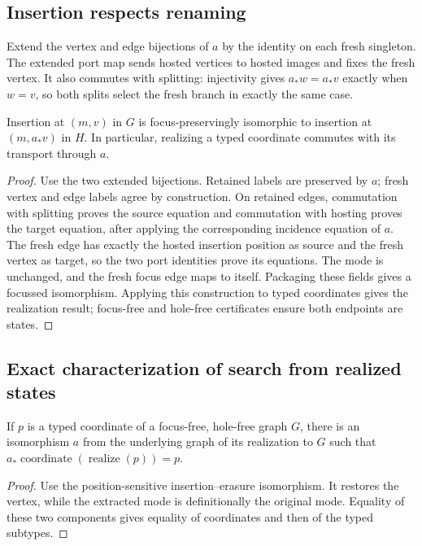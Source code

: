 \subsection{Insertion respects renaming}
Extend the vertex and edge bijections of $a$ by the identity on each fresh
singleton. The extended port map sends hosted vertices to hosted images and
fixes the fresh vertex. It also commutes with splitting: injectivity gives
$a_*w=a_*v$ exactly when $w=v$, so both splits select the fresh branch in
exactly the same case.

\begin{theorem}
Insertion at $(m,v)$ in $G$ is focus-preservingly isomorphic to insertion at
$(m,a_*v)$ in $H$. In particular, realizing a typed coordinate commutes with
its transport through $a$.
\end{theorem}
\begin{proof}
Use the two extended bijections. Retained labels are preserved by $a$;
fresh vertex and edge labels agree by construction. On retained edges,
commutation with splitting proves the source equation and commutation with
hosting proves the target equation, after applying the corresponding
incidence equation of $a$. The fresh edge has exactly the hosted insertion
position as source and the fresh vertex as target, so the two port identities
prove its equations. The mode is unchanged, and the fresh focus edge maps
to itself. Packaging these fields gives a focussed isomorphism. Applying
this construction to typed coordinates gives the realization result;
focus-free and hole-free certificates ensure both endpoints are states.
\end{proof}

\subsection{Exact characterization of search from realized states}
\label{sec:realized-search}
\begin{lemma}
If $p$ is a typed coordinate of a focus-free, hole-free graph $G$, there is
an isomorphism $a$ from the underlying graph of its realization to $G$
such that $a_*\operatorname{coordinate}(\operatorname{realize}(p))=p$.
\end{lemma}
\begin{proof}
Use the position-sensitive insertion--erasure isomorphism. It restores the
vertex, while the extracted mode is definitionally the original mode. Equality
of these two components gives equality of coordinates and then of the typed
subtypes.
\end{proof}


